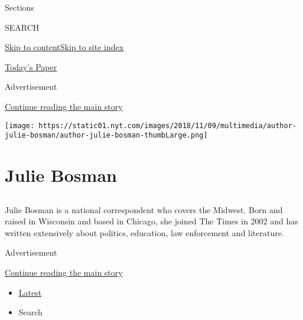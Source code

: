 Sections

SEARCH

\protect\hyperlink{site-content}{Skip to
content}\protect\hyperlink{site-index}{Skip to site index}

\href{https://myaccount.nytimes.com/auth/login?response_type=cookie\&client_id=vi}{}

\href{https://www.nytimes.com/section/todayspaper}{Today's Paper}

Advertisement

\protect\hyperlink{after-top}{Continue reading the main story}

\texttt{[image: https://static01.nyt.com/images/2018/11/09/multimedia/author-julie-bosman/author-julie-bosman-thumbLarge.png]}

\hypertarget{julie-bosman}{%
\section{Julie Bosman}\label{julie-bosman}}

\subsection{}

Julie Bosman is a national correspondent who covers the Midwest. Born
and raised in Wisconsin and based in Chicago, she joined The Times in
2002 and has written extensively about politics, education, law
enforcement and literature.

Advertisement

\protect\hyperlink{after-mid1}{Continue reading the main story}

\begin{itemize}
\tightlist
\item
  \protect\hyperlink{stream-panel}{Latest}
\item
  Search
\end{itemize}

